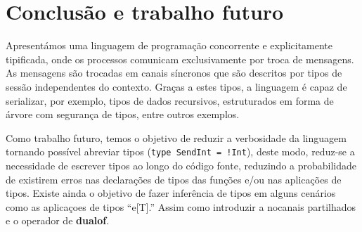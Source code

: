 \section{Conclusão e trabalho futuro}
\lstset{language=CFST, style=eclipse}
Apresentámos uma linguagem de programação concorrente e explicitamente tipificada, onde os processos comunicam exclusivamente por troca de mensagens. As mensagens são trocadas em canais síncronos que são descritos por tipos de sessão independentes do contexto. Graças a estes tipos, a linguagem é capaz de serializar, por exemplo, tipos de dados recursivos, estruturados em forma de árvore com segurança de tipos, entre outros exemplos.

Como trabalho futuro, temos o objetivo de reduzir a verbosidade da linguagem tornando possível abreviar tipos (\lstinline{type SendInt = !Int}), deste modo, reduz-se a necessidade de escrever tipos ao longo do código fonte, reduzindo a probabilidade de existirem erros nas declarações de tipos das funções e/ou nas aplicações de tipos. Existe ainda o objetivo de fazer inferência de tipos em alguns cenários como as aplicaçoes de tipos ``e[T].''
 Assim como introduzir a nocanais partilhados e o operador de \textbf{dualof}.
 
